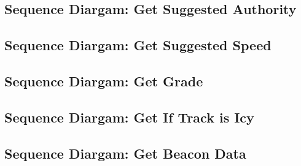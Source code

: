 \documentclass{scrreprt}
\begin{document}
\subsection{Sequence Diargam: Get Suggested Authority}

\subsection{Sequence Diargam: Get Suggested Speed}

\subsection{Sequence Diargam: Get Grade}

\subsection{Sequence Diargam: Get If Track is Icy}

\subsection{Sequence Diargam: Get Beacon Data}
\end{document}
